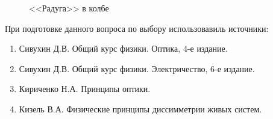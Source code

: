 \documentclass[14pt]{article}
\begin{document}
\begin{figure}[h!]
	\caption{<<Радуга>> в колбе}
\end{figure}

\newpage
При подготовке данного вопроса по выбору использовавиль источники:

\begin{enumerate}
\item Сивухин Д.В. Общий курс физики. Оптика, 4-е издание.
\item Сивухин Д.В. Общий курс физики. Электричество, 6-е издание.
\item Кириченко Н.А. Принципы оптики.
\item Кизель В.А. Физические принципы диссимметрии живых систем.
\end{enumerate}
\end{document}

